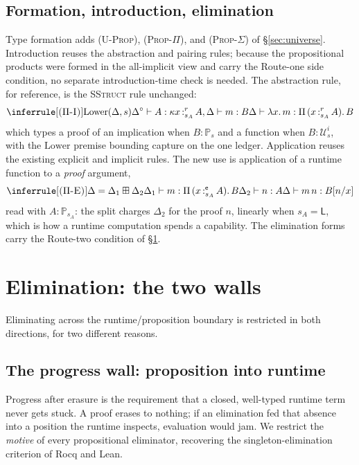 \documentclass[11pt]{article}
\newcommand{\Ty}[2]{\mathcal{U}^{#2}_{#1}}       %
\newcommand{\Prop}[1]{\mathbb{P}_{#1}}            %
\newcommand{\ex}{\mathsf{e}}                      %
\newcommand{\bind}[3]{#1\,{:}^{#2}_{#3}\,}        %
\newcommand{\spv}[1]{#1^{\circ}}                  %
\newcommand{\msum}{\boxplus}                       %
\newcommand{\Pifn}[4]{\Pi\,(\bind{#1}{#2}{#3}#4).\,}
\newcommand{\smdsh}{\mathrel{\vdash}}
\theoremstyle{definition}
\theoremstyle{plain}
\begin{document}
\subsection{Formation, introduction, elimination}

Type formation adds \textsc{(U-Prop)}, \textsc{(Prop-$\Pi$)}, and
\textsc{(Prop-$\Sigma$)} of \S\ref{sec:universe}. Introduction reuses the
abstraction and pairing rules; because the propositional products were formed in
the all-implicit view and carry the Route-one side condition, no separate
introduction-time check is needed. The abstraction rule, for reference, is the
\textsc{SStruct} rule unchanged:
\[
\inferrule[\textsc{($\Pi$-I)}]
  {\mathrm{Lower}(\Delta,s) \\
   \spv{\Delta}\smdsh A:\kappa \\
   \bind{x}{r}{s_A}A,\Delta\smdsh m:B}
  {\Delta\smdsh \lambda x.\,m : \Pifn{x}{r}{s_A}A B}
\]
which types a proof of an implication when $B:\Prop{s}$ and a function when
$B:\Ty{s}{i}$, with the $\mathrm{Lower}$ premise bounding capture on the one
ledger. Application reuses the existing explicit and implicit rules. The new use
is application of a runtime function to a \emph{proof} argument,
\[
\inferrule[\textsc{($\Pi$-E)}]
  {\Delta=\Delta_1\msum\Delta_2 \\
   \Delta_1\smdsh m:\Pifn{x}{\ex}{s_A}A B \\
   \Delta_2\smdsh n:A}
  {\Delta\smdsh m\,n : B[n/x]}
\]
read with $A:\Prop{s_A}$: the split charges $\Delta_2$ for the proof $n$,
linearly when $s_A=\mathsf{L}$, which is how a runtime computation
spends a capability. The elimination forms carry the Route-two condition of
\S\ref{sec:elim}.

\section{Elimination: the two walls}\label{sec:elim}

Eliminating across the runtime/proposition boundary is restricted in both
directions, for two different reasons.

\subsection{The progress wall: proposition into runtime}

Progress after erasure is the requirement that a closed, well-typed runtime term
never gets stuck. A proof erases to nothing; if an elimination fed that absence
into a position the runtime inspects, evaluation would jam. We restrict the
\emph{motive} of every propositional eliminator, recovering the
singleton-elimination criterion of Rocq and Lean.
\end{document}
